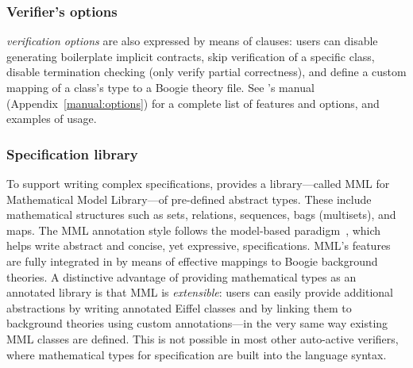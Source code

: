 \subsubsection{Verifier's options}

\AutoProof \emph{verification options} are also expressed by means of  clauses: users can disable generating boilerplate implicit contracts, skip verification of a specific class, 
disable termination checking (only verify partial correctness), and define a custom mapping of a class's type to a Boogie theory file.
See \AutoProof's manual (Appendix~\ref{manual:options}) for a complete list of features and options, and examples of usage.


\subsubsection{Specification library}

To support writing complex specifications, \AutoProof provides a library---called MML for Mathematical Model Library---of pre-defined abstract types.
These include mathematical structures such as sets, relations, sequences, bags (multisets), and maps.
The MML annotation style follows the model-based paradigm~\cite{POLIKARPOVA10}, which helps write abstract and concise, yet expressive, specifications.
MML's features are fully integrated in \AutoProof by means of effective mappings to Boogie background theories.
A distinctive advantage of providing mathematical types as an annotated library is that MML is \emph{extensible}: users can easily provide additional abstractions by writing annotated Eiffel classes and by linking them to background theories using custom  annotations---in the very same way existing MML classes are defined.
This is not possible in most other auto-active verifiers, where mathematical types for specification are built into the language syntax.


